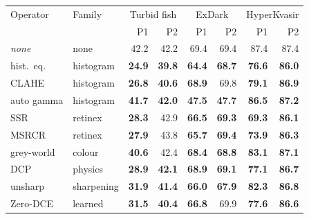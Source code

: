 \begin{tabular}{llrrrrrr}
\toprule
Operator & Family & \multicolumn{2}{c}{Turbid fish} & \multicolumn{2}{c}{ExDark} & \multicolumn{2}{c}{HyperKvasir} \\
 & & P1 & P2 & P1 & P2 & P1 & P2 \\
\midrule
\emph{none} & none & 42.2 & 42.2 & 69.4 & 69.4 & 87.4 & 87.4 \\
\midrule
hist.\ eq. & histogram & \textbf{24.9} & \textbf{39.8} & \textbf{64.4} & \textbf{68.7} & \textbf{76.6} & \textbf{86.0} \\
CLAHE & histogram & \textbf{26.8} & \textbf{40.6} & \textbf{68.9} & 69.8 & \textbf{79.1} & \textbf{86.9} \\
auto gamma & histogram & \textbf{41.7} & \textbf{42.0} & \textbf{47.5} & \textbf{47.7} & \textbf{86.5} & \textbf{87.2} \\
SSR & retinex & \textbf{28.3} & 42.9 & \textbf{66.5} & \textbf{69.3} & \textbf{69.3} & \textbf{86.1} \\
MSRCR & retinex & \textbf{27.9} & 43.8 & \textbf{65.7} & \textbf{69.4} & \textbf{73.9} & \textbf{86.3} \\
grey-world & colour & \textbf{40.6} & 42.4 & \textbf{68.4} & \textbf{68.8} & \textbf{83.1} & \textbf{87.1} \\
DCP & physics & \textbf{28.9} & \textbf{42.1} & \textbf{68.9} & \textbf{69.1} & \textbf{77.1} & \textbf{86.7} \\
unsharp & sharpening & \textbf{31.9} & \textbf{41.4} & \textbf{66.0} & \textbf{67.9} & \textbf{82.3} & \textbf{86.8} \\
Zero-DCE & learned & \textbf{31.5} & \textbf{40.4} & \textbf{66.8} & 69.9 & \textbf{77.6} & \textbf{86.6} \\
\bottomrule
\end{tabular}